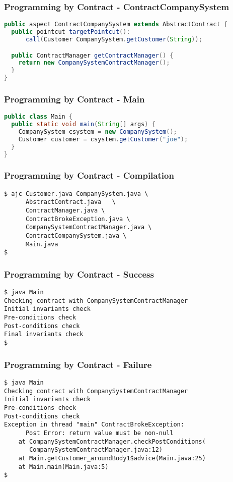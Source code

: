 \documentclass[11pt]{beamer}
\begin{document}
\begin{frame}[fragile]
   \frametitle{Programming by Contract - ContractCompanySystem}
{\scriptsize
\begin{lstlisting}[language=java]
public aspect ContractCompanySystem extends AbstractContract {
  public pointcut targetPointcut():
      call(Customer CompanySystem.getCustomer(String));

  public ContractManager getContractManager() {
    return new CompanySystemContractManager();
  }
}
\end{lstlisting}}
\end{frame}

\begin{frame}[fragile]
   \frametitle{Programming by Contract - Main}
{\scriptsize
\begin{lstlisting}[language=java]
public class Main {
  public static void main(String[] args) {
    CompanySystem csystem = new CompanySystem();
    Customer customer = csystem.getCustomer("joe");
  }
}
\end{lstlisting}}
\end{frame}

\begin{frame}[fragile]
   \frametitle{Programming by Contract - Compilation}
{\scriptsize
\begin{lstlisting}
$ ajc Customer.java CompanySystem.java \
      AbstractContract.java   \
      ContractManager.java \
      ContractBrokeException.java \
      CompanySystemContractManager.java \
      ContractCompanySystem.java \
      Main.java
$ 
\end{lstlisting}}
\end{frame}

\begin{frame}[fragile]
   \frametitle{Programming by Contract - Success}
{\scriptsize
\begin{lstlisting}
$ java Main
Checking contract with CompanySystemContractManager
Initial invariants check
Pre-conditions check
Post-conditions check
Final invariants check
$ 
\end{lstlisting}}
\end{frame}

\begin{frame}[fragile]
   \frametitle{Programming by Contract - Failure}
{\scriptsize
\begin{lstlisting}
$ java Main
Checking contract with CompanySystemContractManager
Initial invariants check
Pre-conditions check
Post-conditions check
Exception in thread "main" ContractBrokeException:
      Post Error: return value must be non-null
	at CompanySystemContractManager.checkPostConditions(
	   CompanySystemContractManager.java:12)
	at Main.getCustomer_aroundBody1$advice(Main.java:25)
	at Main.main(Main.java:5)
$ 
\end{lstlisting}}
\end{frame}
\end{document}
